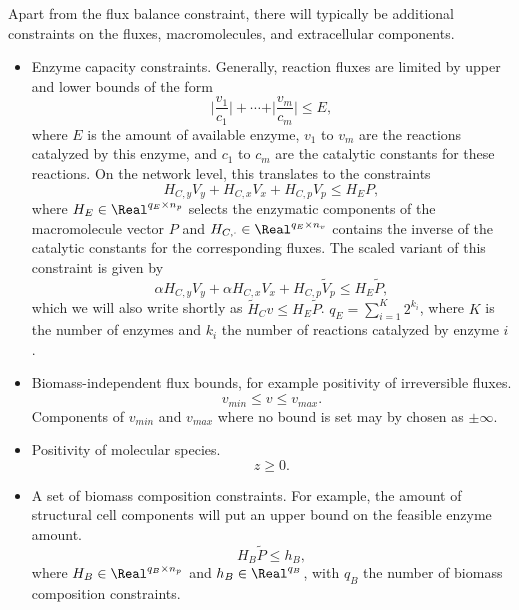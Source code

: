 \documentclass[a4paper,11pt,DIV12]{scrartcl}
\theoremstyle{remark}
\begin{document}
Apart from the flux balance constraint, there will typically be additional constraints on the fluxes, macromolecules, and extracellular components.
\begin{itemize}
\item Enzyme capacity constraints.
  Generally, reaction fluxes are limited by upper and lower bounds of the form
  \begin{equation*}
    \vert\frac{v_1}{c_1}\vert + \dotsb + \vert\frac{v_m}{c_m}\vert \leq E,
  \end{equation*}
  where $E$ is the amount of available enzyme, $v_1$ to $v_m$ are the reactions catalyzed by this enzyme, and $c_1$ to $c_m$ are the catalytic constants for these reactions.
  On the network level, this translates to the constraints
  \begin{equation}
    \label{eq:enzyme-constraint}
    H_{C,y} V_y + H_{C,x} V_x + H_{C,p} V_p \leq H_E P,
  \end{equation}
  where $H_E \in \Real^{q_E \times n_p}$ selects the enzymatic components of the macromolecule vector $P$ and $H_{C,\cdot} \in \Real^{q_E \times n_v}$ contains the inverse of the catalytic constants for the corresponding fluxes.
  The scaled variant of this constraint is given by
  \begin{equation}
    \label{eq:enzyme-constraint-scaled}
    \alpha H_{C,y} V_y + \alpha H_{C,x} V_x + H_{C,p} \tilde V_p \leq H_E \tilde P,
  \end{equation}
  which we will also write shortly as $\tilde H_{C} v \leq H_E \tilde P$.
  $q_E = \sum_{i=1}^K 2^{k_i}$, where $K$ is the number of enzymes and $k_i$ the number of reactions catalyzed by enzyme $i$.
\item Biomass-independent flux bounds, for example positivity of irreversible fluxes.
  \begin{equation}
    \label{eq:flux-bounds}
    v_{min} \leq v \leq v_{max}.
  \end{equation}
  Components of $v_{min}$ and $v_{max}$ where no bound is set may by chosen as $\pm \infty$.
\item Positivity of molecular species.
  \begin{equation}
    \label{eq:positive-concentrations}
    z \geq 0.
  \end{equation}
\item A set of biomass composition constraints.
  For example, the amount of structural cell components will put an upper bound on the feasible enzyme amount.
  \begin{equation}
    \label{eq:bm-constraint}
    H_B \tilde P \leq h_B,
  \end{equation}
  where $H_B \in \Real^{q_B \times n_p}$ and $h_B \in \Real^{q_B}$, with $q_B$ the number of biomass composition constraints.
\end{itemize}
\end{document}
